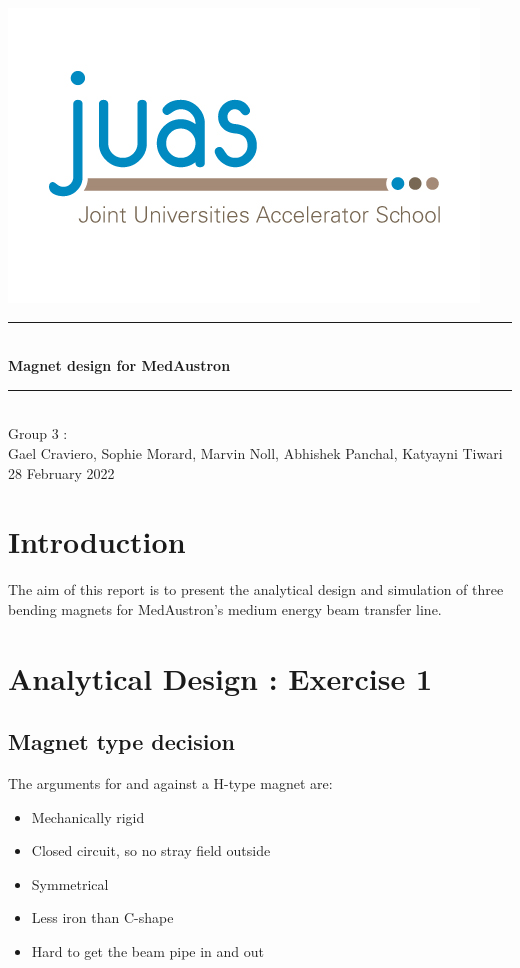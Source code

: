 \documentclass[10pt,a4paper,noendnumber=true]{scrartcl}
\newcommand\pro{\item[$+$]}
\newcommand\con{\item[$-$]}
\begin{document}
\begin{titlepage}
\begin{sffamily}
\begin{center}
\begin{minipage}{1\textwidth}
      \begin{center} 
      \includegraphics[height=0.4 \textwidth]{juas.jpeg} 
      \end{center} 
    \end{minipage}
\vspace{4.5cm}

\rule{\linewidth}{1.5pt} \\[0.5cm]
\Large \textbf{Magnet design for MedAustron} \\[0.5cm]
\rule{\linewidth}{1.5pt} \\
\vfill
\Large Group 3 : \\ [0.5cm]
\normalsize Gael Craviero, Sophie Morard, Marvin Noll, Abhishek Panchal, Katyayni Tiwari  \\ [0.5cm]
\normalsize 28 February 2022
\end{center}
\end{sffamily}
\end{titlepage}
\tableofcontents
\newpage
\section*{Introduction}
The aim of this report is to present the analytical design and simulation of three bending magnets for MedAustron's medium energy beam transfer line.

\section{\textbf{Analytical Design : Exercise 1}}
\subsection{Magnet type decision}
The arguments for and against a H-type magnet are:
\begin{itemize}
\pro Mechanically rigid
\pro Closed circuit, so no stray field outside
\pro Symmetrical
\pro Less iron than C-shape
\con Hard to get the beam pipe in and out
\end{itemize}
\end{document}
